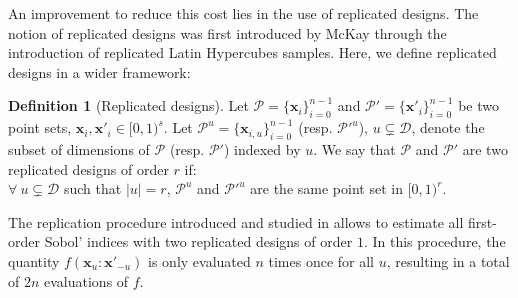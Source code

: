 \documentclass[]{elsarticle}
\theoremstyle{definition}
\newtheorem{defin}{Definition}
\newcommand{\bvec}[1]{\boldsymbol{#1}}
\newcommand{\vx}{\bvec{x}}
\begin{document}
An improvement to reduce this cost lies in the use of replicated designs. The notion of replicated designs was first introduced by McKay \cite{mckay} through the introduction of replicated Latin Hypercubes samples. Here, we define replicated designs in a wider framework:
\begin{defin}[Replicated designs]
Let $\mathcal{P}=\{\vx_i\}_{i=0}^{n-1}$ and $\mathcal{P}'=\{{\vx'}_i\}_{i=0}^{n-1}$ be two point sets,
$\vx_i,\vx'_i\in[0,1)^{s}$. Let $\mathcal{P}^u=\{\vx_{i,u}\}_{i=0}^{n-1}$ (resp. $\mathcal{P}'^u$), $u \subsetneq \mathcal{D}$, denote the subset of dimensions of $\mathcal{P}$ (resp. $\mathcal{P}'$) indexed by $u$. We say that $\mathcal{P}$ and $\mathcal{P}'$ are two replicated designs of order $r$ if:\\
$\forall \ u \subsetneq \mathcal{D}$ such that $|u|=r$, $\mathcal{P}^u$ and $\mathcal{P}'^u$ are the same point set in $[0,1)^r$.
\end{defin}
The replication procedure introduced and studied in \cite{mara,tissot} allows to estimate all first-order Sobol' indices with two replicated designs of order $1$. In this procedure, the quantity $f(\vx_u:{\vx'}_{-u})$ is only evaluated $n$ times once for all $u$, resulting in a total of $2n$ evaluations of $f$. %
\end{document}
